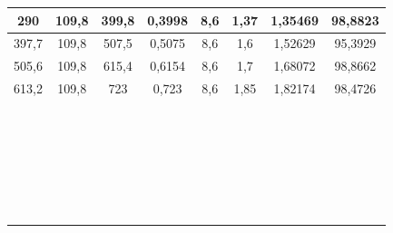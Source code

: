 \begin{tabular}{|*{8}{c|}}
\hline 
290 & 109,8 & 399,8 & 0,3998 & 8,6 & 1,37 & 1,35469 & 98,8823 \\ \hline 
 397,7 & 109,8 & 507,5 & 0,5075 & 8,6 & 1,6 & 1,52629 & 95,3929 \\ \hline 
 505,6 & 109,8 & 615,4 & 0,6154 & 8,6 & 1,7 & 1,68072 & 98,8662 \\ \hline 
 613,2 & 109,8 & 723 & 0,723 & 8,6 & 1,85 & 1,82174 & 98,4726 \\ \hline 
  &  &  &  &  &  &  &  \\ \hline 
  &  &  &  &  &  &  &  \\ \hline 
  &  &  &  &  &  &  &  \\ \hline 
  &  &  &  &  &  &  &  \\ \hline 
  &  &  &  &  &  &  &  \\ \hline 
  &  &  &  &  &  &  &  \\ \hline 
  &  &  &  &  &  &  &  \\ \hline 
  &  &  &  &  &  &  &  \\ \hline 
  &  &  &  &  &  &  &  \\ \hline 
  &  &  &  &  &  &  &  \\ \hline 
  &  &  &  &  &  &  &  \\ \hline 
  &  &  &  &  &  &  &  \\ \hline 
  &  &  &  &  &  &  &  \\ \hline 
  &  &  &  &  &  &  &  \\ \hline 
  &  &  &  &  &  &  &  \\ \hline 
  &  &  &  &  &  &  &  \\ \hline 
  &  &  &  &  &  &  &  \\ \hline 
  &  &  &  &  &  &  &  \\ \hline 
  &  &  &  &  &  &  &  \\ \hline 
  &  &  &  &  &  &  &  \\ \hline 
  &  &  &  &  &  &  &  \\ \hline 
  &  &  &  &  &  &  &  \\ \hline 
  &  &  &  &  &  &  &  \\ \hline 
  &  &  &  &  &  &  &  \\ \hline 
  &  &  &  &  &  &  &  \\ \hline 
  &  &  &  &  &  &  &  \\ \hline 
 \end{tabular} 
